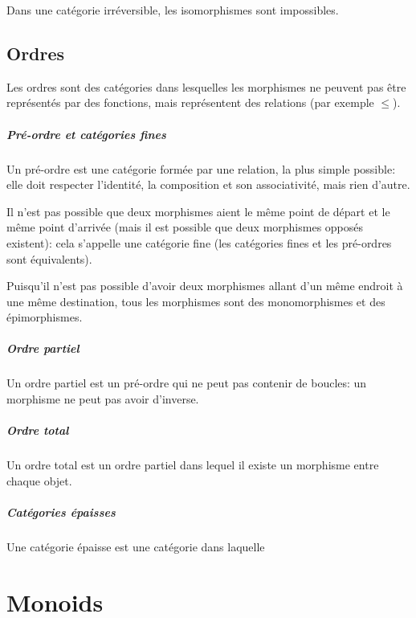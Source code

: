 \documentclass[a4paper,10pt,french,openany]{memoir}
\begin{document}
Dans une catégorie irréversible, les isomorphismes sont impossibles.

\section{Ordres}

Les ordres sont des catégories dans lesquelles les morphismes ne peuvent pas être représentés par des fonctions, mais représentent des relations (par exemple $\leq$).

\paragraph{Pré-ordre et catégories fines}
Un pré-ordre est une catégorie formée par une relation, la plus simple possible: elle doit respecter l'identité, la composition et son associativité, mais rien d'autre.

Il n'est pas possible que deux morphismes aient le même point de départ et le même point d'arrivée (mais il est possible que deux morphismes opposés existent): cela s'appelle une catégorie fine (les catégories fines et les pré-ordres sont équivalents).

Puisqu'il n'est pas possible d'avoir deux morphismes allant d'un même endroit à une même destination, tous les morphismes sont des monomorphismes et des épimorphismes.

\paragraph{Ordre partiel}
Un ordre partiel est un pré-ordre qui ne peut pas contenir de boucles: un morphisme ne peut pas avoir d'inverse.

\paragraph{Ordre total}
Un ordre total est un ordre partiel dans lequel il existe un morphisme entre chaque objet.

\paragraph{Catégories épaisses}
Une catégorie épaisse est une catégorie dans laquelle 

\chapter{Monoids}
\end{document}
